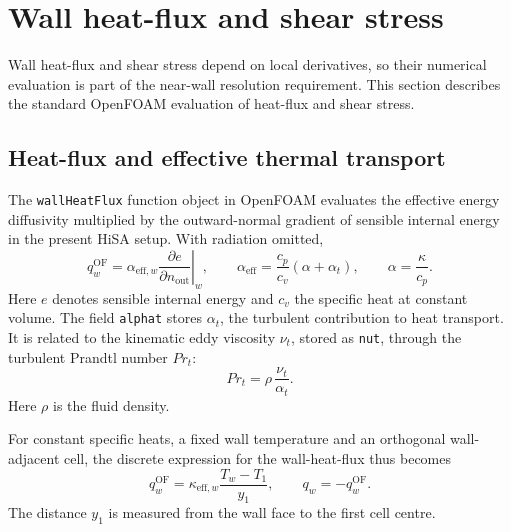 \section{Wall heat-flux and shear stress}
\label{sec:openFOAM_qw_tauw}

Wall heat-flux and shear stress depend on local derivatives, so their numerical evaluation is part of the near-wall resolution requirement. This section describes the standard OpenFOAM evaluation of heat-flux and shear stress.

\subsection{Heat-flux and effective thermal transport}

The \texttt{wallHeatFlux} function object in OpenFOAM evaluates the effective energy diffusivity multiplied by the outward-normal gradient of sensible internal energy in the present HiSA setup. With radiation omitted,
\begin{equation}
    q_w^{\mathrm{OF}}
    = \alpha_{\mathrm{eff},w}\left.\frac{\partial e}{\partial n_{\mathrm{out}}}\right|_w,
    \qquad
    \alpha_{\mathrm{eff}}
    = \frac{c_p}{c_v}(\alpha+\alpha_t),
    \qquad
    \alpha=\frac{\kappa}{c_p}.
    \label{eq:q_w_openFOAM_math}
\end{equation}
Here \(e\) denotes sensible internal energy and \(c_v\) the specific heat at constant volume. The field \texttt{alphat} stores \(\alpha_t\), the turbulent contribution to heat transport. It is related to the kinematic eddy viscosity \(\nu_t\), stored as \texttt{nut}, through the turbulent Prandtl number \(Pr_t\):
\begin{equation}
    Pr_t=\rho\,\frac{\nu_t}{\alpha_t}.
    \label{eq:openfoam-alphat-nut}
\end{equation}
Here \(\rho\) is the fluid density.
\par\medskip

For constant specific heats, a fixed wall temperature and an orthogonal wall-adjacent cell, the discrete expression for the wall-heat-flux thus becomes
\begin{equation}
    q_w^{\mathrm{OF}}
    = \kappa_{\mathrm{eff},w}\frac{T_w-T_1}{y_1},
    \qquad q_w=-q_w^{\mathrm{OF}}.
    \label{eq:q_w_openFOAM_simple}
\end{equation}
The distance \(y_1\) is measured from the wall face to the first cell centre.


